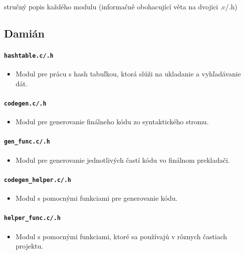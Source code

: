 stručný popis každého modulu (informačně obohacující věta na dvojici .c/.h)

\subsection{Damián}

\paragraph{\texttt{hashtable.c/.h}}
\begin{itemize}
    \item Modul pre prácu s hash tabuľkou, ktorá slúži na ukladanie a vyhľadávanie dát.
\end{itemize}

\paragraph{\texttt{codegen.c/.h}}
\begin{itemize}
    \item Modul pre generovanie finálneho kódu zo syntaktického stromu.
\end{itemize}

\paragraph{\texttt{gen\_func.c/.h}}
\begin{itemize}
    \item Modul pre generovanie jednotlivých častí kódu vo finálnom prekladači.
\end{itemize}

\paragraph{\texttt{codegen\_helper.c/.h}}
\begin{itemize}
    \item Modul s pomocnými funkciami pre generovanie kódu.
\end{itemize}

\paragraph{\texttt{helper\_func.c/.h}}
\begin{itemize}
    \item Modul s pomocnými funkciami, ktoré sa používajú v rôznych častiach projektu.
\end{itemize}

